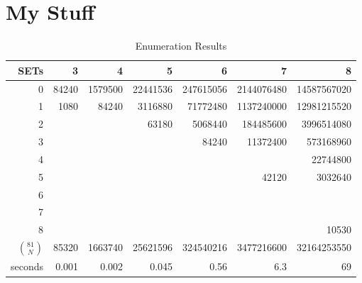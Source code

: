 \documentclass[10pt]{amsart}
\begin{document}
\section{My Stuff}


\begin{table}
  \caption{Enumeration Results}
  \centering
  \begin{tabular}{r | r r r r r r }
    SETs & 3 & 4 & 5 & 6 & 7 & 8   \\
    \hline
0  & 84240 & 1579500 & 22441536 & 247615056 & 2144076480 & 14587567020  \\
1  & 1080 & 84240 & 3116880 & 71772480 & 1137240000 & 12981215520 \\
2  &  &  & 63180 & 5068440 & 184485600 & 3996514080 \\
3  &  &  &  & 84240 & 11372400 & 573168960 \\
4  &  &  &  &  &  & 22744800 \\
5  &  &  &  &  & 42120 & 3032640 \\
6  &  &  &  &  &  &  \\
7  &  &  &  &  &  &  \\
8  &  &  &  &  &  & 10530 \\
\hline
$\binom{81}{N}$ & 85320 & 1663740 & 25621596 & 324540216 & 3477216600 & 32164253550  \\
\hline
seconds & 0.001 & 0.002 & 0.045 & 0.56 & 6.3 & 69 
  \end{tabular}

  \vskip 5mm


\end{table}
\end{document}
